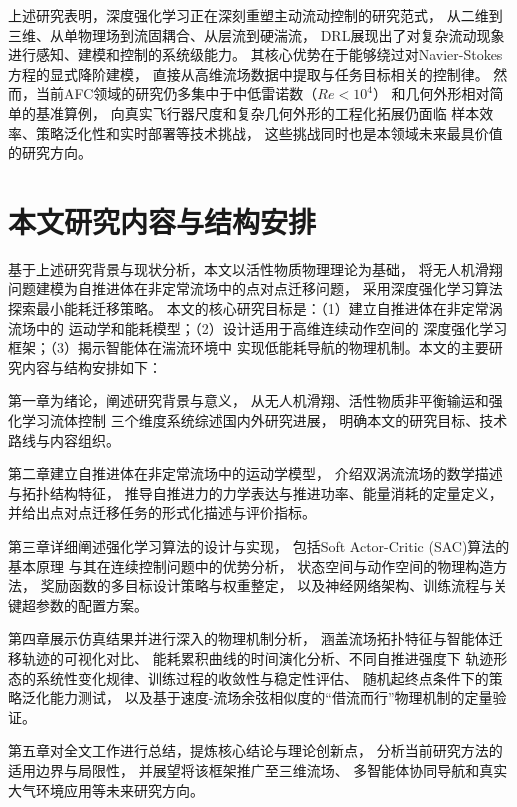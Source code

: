 上述研究表明，深度强化学习正在深刻重塑主动流动控制的研究范式，
从二维到三维、从单物理场到流固耦合、从层流到硬湍流，
DRL展现出了对复杂流动现象进行感知、建模和控制的系统级能力。
其核心优势在于能够绕过对Navier-Stokes方程的显式降阶建模，
直接从高维流场数据中提取与任务目标相关的控制律。
然而，当前AFC领域的研究仍多集中于中低雷诺数（$Re < 10^4$）
和几何外形相对简单的基准算例，
向真实飞行器尺度和复杂几何外形的工程化拓展仍面临
样本效率、策略泛化性和实时部署等技术挑战，
这些挑战同时也是本领域未来最具价值的研究方向。
\section{本文研究内容与结构安排}

基于上述研究背景与现状分析，本文以活性物质物理理论为基础，
将无人机滑翔问题建模为自推进体在非定常流场中的点对点迁移问题，
采用深度强化学习算法探索最小能耗迁移策略。
本文的核心研究目标是：（1）建立自推进体在非定常涡流场中的
运动学和能耗模型；（2）设计适用于高维连续动作空间的
深度强化学习框架；（3）揭示智能体在湍流环境中
实现低能耗导航的物理机制。本文的主要研究内容与结构安排如下：

第一章为绪论，阐述研究背景与意义，
从无人机滑翔、活性物质非平衡输运和强化学习流体控制
三个维度系统综述国内外研究进展，
明确本文的研究目标、技术路线与内容组织。

第二章建立自推进体在非定常流场中的运动学模型，
介绍双涡流流场的数学描述与拓扑结构特征，
推导自推进力的力学表达与推进功率、能量消耗的定量定义，
并给出点对点迁移任务的形式化描述与评价指标。

第三章详细阐述强化学习算法的设计与实现，
包括Soft Actor-Critic (SAC)算法的基本原理
与其在连续控制问题中的优势分析，
状态空间与动作空间的物理构造方法，
奖励函数的多目标设计策略与权重整定，
以及神经网络架构、训练流程与关键超参数的配置方案。

第四章展示仿真结果并进行深入的物理机制分析，
涵盖流场拓扑特征与智能体迁移轨迹的可视化对比、
能耗累积曲线的时间演化分析、不同自推进强度下
轨迹形态的系统性变化规律、训练过程的收敛性与稳定性评估、
随机起终点条件下的策略泛化能力测试，
以及基于速度-流场余弦相似度的“借流而行”物理机制的定量验证。

第五章对全文工作进行总结，提炼核心结论与理论创新点，
分析当前研究方法的适用边界与局限性，
并展望将该框架推广至三维流场、
多智能体协同导航和真实大气环境应用等未来研究方向。